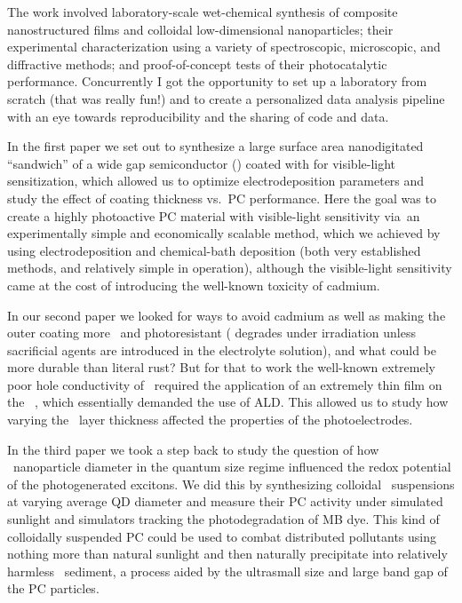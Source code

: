 \documentclass[draft,webedition,openright,titles,swedish,english]{LuaUUThesis}\usepackage[]{graphicx}\usepackage[]{xcolor}
\newcommand{\via}{via}
\newcommand{\vs}{vs.}
\begin{document}
The work involved laboratory-scale wet-chemical synthesis
of composite nanostructured films and colloidal low-dimensional nanoparticles;
their experimental characterization using a variety of spectroscopic, microscopic,
and diffractive methods;
and proof-of-concept tests of their photocatalytic performance.
Concurrently I got the opportunity to set up a laboratory from scratch (that was really fun!)
and to create a personalized data analysis pipeline with an eye towards
reproducibility and the sharing of code and data.

In the first paper
we set out to synthesize a large surface area nanodigitated 
\enquote{sandwich} of a wide gap semiconductor (\ZnO) coated with 
for visible-light sensitization, which allowed us to optimize electrodeposition
parameters and study the effect of  coating thickness \vs\ \gls{PC} performance.
Here the goal was to create a highly photoactive \gls{PC} material with visible-light sensitivity
\via\ an experimentally simple and economically scalable method, which we
achieved by using electrodeposition and chemical-bath deposition (both very
established methods, and relatively simple in operation), although the visible-light
sensitivity came at the cost of introducing the well-known toxicity of cadmium.

In our second paper we
looked for ways to avoid cadmium as well as making the outer coating
more \pH\ and photoresistant ( degrades under irradiation unless sacrificial
agents are introduced in the electrolyte solution), and what could be more
durable than literal rust?
But for that to work the well-known extremely poor hole conductivity of \hematite\
required the application of an extremely thin film on the \ZnO\ ,
which essentially demanded the use of \gls{ALD}.
This allowed us to study how varying the \hematite\ layer thickness affected
the properties of the photoelectrodes.

In the third paper
we took a step back to study the question of how \ZnO\ nanoparticle
diameter in the quantum size regime influenced the redox potential
of the photogenerated excitons.
We did this by synthesizing colloidal \zincox\ suspensions at varying
average \gls{QD} diameter and measure their \gls{PC} activity under
simulated sunlight and simulators tracking the photodegradation of \gls{MB} dye.
This kind of colloidally suspended \gls{PC} could be used to
combat distributed pollutants using nothing more than natural sunlight and
then naturally precipitate into relatively harmless \ZnO\ sediment, a process
aided by the ultrasmall size and large band gap of the \gls{PC} particles.
\end{document}

